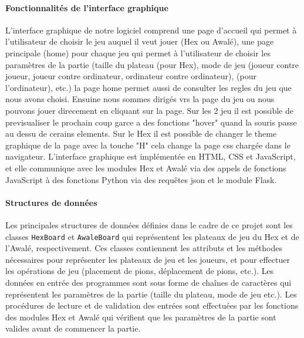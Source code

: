 \paragraph{Fonctionnalités de l'interface graphique}
L'interface graphique de notre logiciel comprend une page d'accueil qui permet à l'utilisateur
de choisir le jeu auquel il veut jouer (Hex ou Awalé), une page principale (home) pour chaque jeu
qui permet à l'utilisateur de choisir les paramètres de la partie (taille du plateau (pour Hex),
mode de jeu (joueur contre joueur, joueur contre ordinateur, ordinateur contre ordinateur),
(pour l'ordinateur), etc.) la page home permet aussi de consulter les regles du jeu que nous avons choisi.
Ensuine nous sommes dirigés vrs la page du jeu ou nous pouvons jouer direcement en cliquant sur la page.
Sur les 2 jeu il est possible de previsualiser le prochain coup garce a des fonctions "hover" quand la souris passe
au dessu de cerains elements.
Sur le Hex il est possible de changer le theme graphique de la page avec la touche "H" cela change la page css chargée dans le navigateur.
L'interface graphique est implémentée en HTML, CSS et JavaScript, et
elle communique avec les modules Hex et Awalé via des appels de fonctions JavaScript à des
fonctions Python via des requêtes json et le module Flask.

\paragraph{Structures de données}
Les principales structures de données définies dans le cadre de ce projet sont les classes
\texttt{HexBoard} et \texttt{AwaleBoard} qui représentent les plateaux de jeu du Hex et de
l'Awalé, respectivement. Ces classes contiennent les attributs et les méthodes nécessaires
pour représenter les plateaux de jeu et les joueurs, et pour effectuer les opérations de jeu
(placement de pions, déplacement de pions, etc.). Les données en entrée des programmes sont
sous forme de chaînes de caractères qui représentent les paramètres de la partie (taille du
plateau, mode de jeu etc.). Les procédures de lecture et de validation
des entrées sont effectuées par les fonctions des modules Hex et Awalé qui vérifient que les
paramètres de la partie sont valides avant de commencer la partie.

